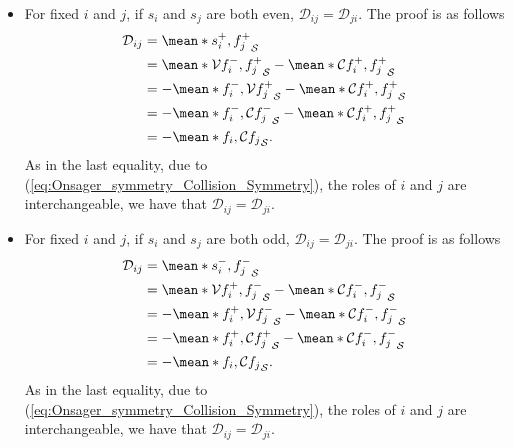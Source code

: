 \documentclass[10pt]{iopart}
\begin{document}
\begin{itemize}
	\item For fixed $i$ and $j$, if $s_i$ and $s_j$ are both even, $\mathcal{D}_{ij} = \mathcal{D}_{ji}$. The proof is as follows 
	\begin{align*}
		\mathcal{D}_{ij} & = \mean*{s_i^+, f_j^+}_{\mathcal{S}} \\
		& 
		= \mean*{\mathcal{V} f_i^-, f_j^+}_{\mathcal{S}}
		- \mean*{\mathcal{C} f_i^+, f_j^+}_{\mathcal{S}} \\
		& 
		= - \mean*{f_i^-, \mathcal{V} f_j^+}_{\mathcal{S}}
		- \mean*{\mathcal{C} f_i^+, f_j^+}_{\mathcal{S}} \\
		& 
		= - \mean*{f_i^-, \mathcal{C} f_j^-}_{\mathcal{S}}
		- \mean*{\mathcal{C} f_i^+, f_j^+}_{\mathcal{S}}\\
		& 
		= - \mean*{f_i, \mathcal{C} f_j}_{\mathcal{S}}.
	\end{align*}
	As in the last equality, due to (\ref{eq:Onsager_symmetry_Collision_Symmetry}), the roles of $i$ and $j$ are interchangeable, we have that $\mathcal{D}_{ij} = \mathcal{D}_{ji}$.
	
	\item For fixed $i$ and $j$, if $s_i$ and $s_j$ are both odd, $\mathcal{D}_{ij} = \mathcal{D}_{ji}$. The proof is as follows 
	\begin{align*}
		\mathcal{D}_{ij} & = \mean*{s_i^-, f_j^-}_{\mathcal{S}} \\
		& 
		= \mean*{\mathcal{V} f_i^+, f_j^-}_{\mathcal{S}}
		- \mean*{\mathcal{C} f_i^-, f_j^-}_{\mathcal{S}} \\
		& 
		= - \mean*{f_i^+, \mathcal{V} f_j^-}_{\mathcal{S}}
		- \mean*{\mathcal{C} f_i^-, f_j^-}_{\mathcal{S}} \\
		& 
		= - \mean*{f_i^+, \mathcal{C} f_j^+}_{\mathcal{S}}
		- \mean*{\mathcal{C} f_i^-, f_j^-}_{\mathcal{S}} \\
		& 
		= - \mean*{f_i, \mathcal{C} f_j}_{\mathcal{S}}.
	\end{align*}
	As in the last equality, due to (\ref{eq:Onsager_symmetry_Collision_Symmetry}), the roles of $i$ and $j$ are interchangeable, we have that $\mathcal{D}_{ij} = \mathcal{D}_{ji}$.
	

\end{itemize}
\end{document}
